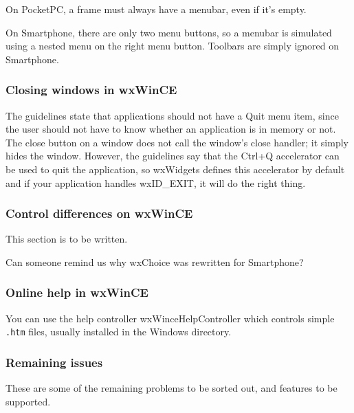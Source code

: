 On PocketPC, a frame must always have a menubar, even if it's empty.

On Smartphone, there are only two menu buttons, so a menubar is simulated
using a nested menu on the right menu button. Toolbars are simply ignored on
Smartphone.

\subsubsection{Closing windows in wxWinCE}

The guidelines state that applications should not have a Quit menu item,
since the user should not have to know whether an application is in memory
or not. The close button on a window does not call the window's
close handler; it simply hides the window. However, the guidelines say that
the Ctrl+Q accelerator can be used to quit the application, so wxWidgets
defines this accelerator by default and if your application handles
wxID\_EXIT, it will do the right thing.

\subsubsection{Control differences on wxWinCE}

This section is to be written.

Can someone remind us why wxChoice was rewritten for Smartphone?

\subsubsection{Online help in wxWinCE}

You can use the help controller wxWinceHelpController which controls
simple {\tt .htm} files, usually installed in the Windows directory.

\subsubsection{Remaining issues}

These are some of the remaining problems to be sorted out, and features
to be supported.

